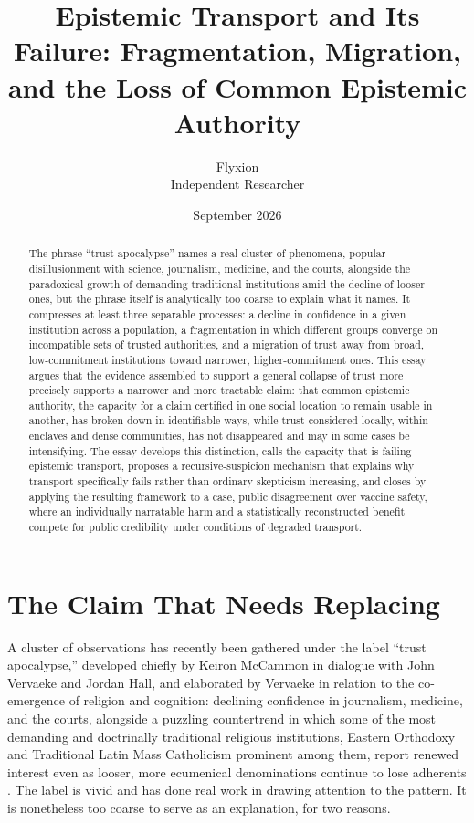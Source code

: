 \documentclass[11pt]{article}
\title{\textbf{Epistemic Transport and Its Failure: Fragmentation, Migration, and the Loss of Common Epistemic Authority}}
\author{Flyxion \\ Independent Researcher}
\date{September 2026}
\begin{document}
\maketitle

\begin{abstract}
The phrase ``trust apocalypse'' names a real cluster of phenomena, popular disillusionment with science, journalism, medicine, and the courts, alongside the paradoxical growth of demanding traditional institutions amid the decline of looser ones, but the phrase itself is analytically too coarse to explain what it names. It compresses at least three separable processes: a decline in confidence in a given institution across a population, a fragmentation in which different groups converge on incompatible sets of trusted authorities, and a migration of trust away from broad, low-commitment institutions toward narrower, higher-commitment ones. This essay argues that the evidence assembled to support a general collapse of trust more precisely supports a narrower and more tractable claim: that common epistemic authority, the capacity for a claim certified in one social location to remain usable in another, has broken down in identifiable ways, while trust considered locally, within enclaves and dense communities, has not disappeared and may in some cases be intensifying. The essay develops this distinction, calls the capacity that is failing epistemic transport, proposes a recursive-suspicion mechanism that explains why transport specifically fails rather than ordinary skepticism increasing, and closes by applying the resulting framework to a case, public disagreement over vaccine safety, where an individually narratable harm and a statistically reconstructed benefit compete for public credibility under conditions of degraded transport.
\end{abstract}

\section{The Claim That Needs Replacing}

A cluster of observations has recently been gathered under the label ``trust apocalypse,'' developed chiefly by Keiron McCammon in dialogue with John Vervaeke and Jordan Hall, and elaborated by Vervaeke in relation to the co-emergence of religion and cognition: declining confidence in journalism, medicine, and the courts, alongside a puzzling countertrend in which some of the most demanding and doctrinally traditional religious institutions, Eastern Orthodoxy and Traditional Latin Mass Catholicism prominent among them, report renewed interest even as looser, more ecumenical denominations continue to lose adherents \citep{mccammon2025,vervaeke2026}. The label is vivid and has done real work in drawing attention to the pattern. It is nonetheless too coarse to serve as an explanation, for two reasons.
\end{document}
